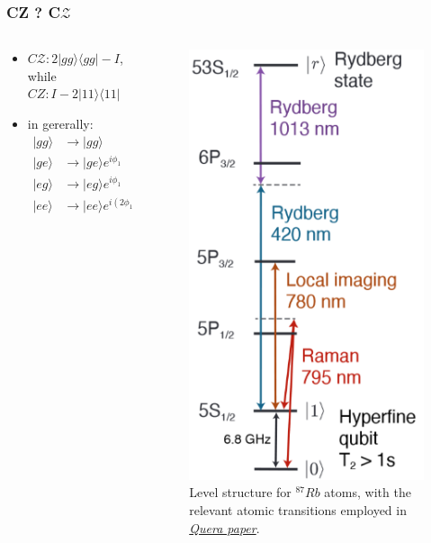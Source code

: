 \documentclass[18 pt]{beamer}
\begin{document}
\begin{frame}
    \frametitle{CZ ? C$\mathcal{Z}$}
    \begin{columns}
        \begin{column}{.5\textwidth}
            \begin{itemize}
                \item $C\mathcal{Z}: 2|gg\rangle\langle gg| - I$, while $CZ: I - 2|11\rangle\langle 11|$
                \item in gererally:
                \begin{align*}
                    |gg\rangle & \rightarrow |gg\rangle \\
                    |ge\rangle & \rightarrow |ge\rangle e^{i\phi_1} \\
                    |eg\rangle & \rightarrow |eg\rangle e^{i\phi_1} \\
                    |ee\rangle & \rightarrow |ee\rangle e^{i(2\phi_1 + \pi)}
                \end{align*}
            \end{itemize}
        \end{column}
        \begin{column}{.5\textwidth}
            \begin{figure}
                \includegraphics[width=.5\textwidth]{level.png}
                \caption{Level structure for $^{87}Rb$ atoms, with the relevant atomic transitions employed in \href{http://arxiv.org/abs/2312.03982}{\textit{Quera paper}}.}
            \end{figure}
        \end{column}
    \end{columns}
\end{frame}
\end{document}
